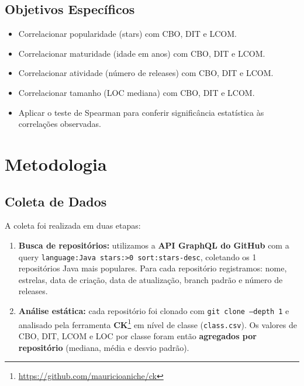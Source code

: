 \documentclass[10pt,a4paper,twocolumn]{article}
\begin{document}
\subsection{Objetivos Específicos}

\begin{itemize}
  \item Correlacionar popularidade (stars) com CBO, DIT e LCOM.
  \item Correlacionar maturidade (idade em anos) com CBO, DIT e LCOM.
  \item Correlacionar atividade (número de releases) com CBO, DIT e LCOM.
  \item Correlacionar tamanho (LOC mediana) com CBO, DIT e LCOM.
  \item Aplicar o teste de Spearman para conferir significância estatística
    às correlações observadas.
\end{itemize}

\section{Metodologia}

\subsection{Coleta de Dados}

A coleta foi realizada em duas etapas:

\begin{enumerate}
  \item \textbf{Busca de repositórios:} utilizamos a \textbf{API GraphQL do
    GitHub} com a query \texttt{language:Java stars:>0 sort:stars-desc},
    coletando os 1 repositórios Java mais populares.
    Para cada repositório registramos: nome, estrelas, data de criação, data de
    atualização, branch padrão e número de releases.

  \item \textbf{Análise estática:} cada repositório foi clonado com
    \texttt{git clone --depth 1} e analisado pela ferramenta
    \textbf{CK}\footnote{\url{https://github.com/mauricioaniche/ck}} em
    nível de classe (\texttt{class.csv}).
    Os valores de CBO, DIT, LCOM e LOC por classe foram então \textbf{agregados
    por repositório} (mediana, média e desvio padrão).
\end{enumerate}
\end{document}
